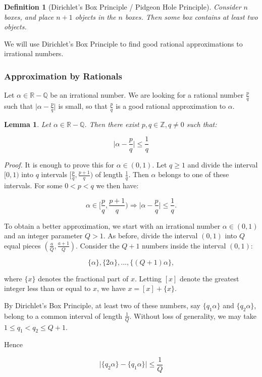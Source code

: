 \documentclass[12pt,letterpaper]{report}
\newcommand\be{\begin{equation}}
\newcommand\ee{\end{equation}}
\newcommand{\R}{\ensuremath{\mathbb{R}}}
\newcommand{\Z}{\ensuremath{\mathbb{Z}}}
\newcommand{\Q}{\mathbb{Q}}
\newtheorem{lem}[thm]{Lemma}
\newtheorem{defi}[thm]{Definition}
\begin{document}
\begin{defi}[Dirichlet's Box Principle / Pidgeon Hole Principle]
Consider $n$ boxes, and place $n+1$ objects in the $n$ boxes. Then
some box contains at least two objects. \end{defi}

We will use Dirichlet's Box Principle to find good rational
approximations to irrational numbers.

\subsubsection{Approximation by Rationals}

Let $\alpha \in \R - \Q$ be an irrational number. We are looking
for a rational number $\frac{p}{q}$ such that
$\Big|\alpha-\frac{p}{q}\Big|$ is small, so that $\frac{p}{q}$ is
a good rational approximation to $\alpha$.


\begin{lem}
Let $\alpha \in \R -\Q$. Then there exist $p,q\in \Z, q\neq 0$
such that:

\be \Bigg|\alpha-\frac{p}{q}\Bigg| \le \frac{1}{q} \ee
\end{lem}
\emph{Proof.} It is enough to prove this for $\alpha \in (0,1)$.
Let $q\geq 1$ and divide the interval $[0,1)$ into $q$ intervals
$[\frac{p}{q},\frac{p+1}{q})$ of length $\frac{1}{q}$. Then
$\alpha$ belongs to one of these intervals. For some $0<p<q$ we
then have:

\be \alpha\in \Bigg[\frac{p}{q},\frac{p+1}{q}\Bigg) \Rightarrow
\Bigg|\alpha-\frac{p}{q}\Bigg|\leq \frac{1}{q}. \ee

To obtain a better approximation, we start with an irrational
number $\alpha\in (0,1)$ and an integer parameter $Q>1$. As
before, divide the interval $(0,1)$ into $Q$ equal pieces
$(\frac{a}{Q},\frac{a+1}{Q})$. Consider the $Q+1$ numbers inside
the interval $(0,1)$:

\be \{\alpha\}, \{2\alpha\}, ..., \{(Q+1)\alpha\}, \ee

where $\{x\}$ denotes the fractional part of $x$. Letting $[x]$
denote the greatest integer less than or equal to $x$, we have $x
= [x] + \{x\}$.

By Dirichlet's Box Principle, at least two of these numbers, say
$\{q_1\alpha\}$ and $\{q_2\alpha\}$, belong to a common interval
of length $\frac{1}{Q}$. Without loss of generality, we may take
$1\leq q_1<q_2\leq Q+1$.

Hence

\be \Big|\{q_2\alpha\}-\{q_1\alpha\}\Big|\leq \frac{1}{Q} \ee
\end{document}
